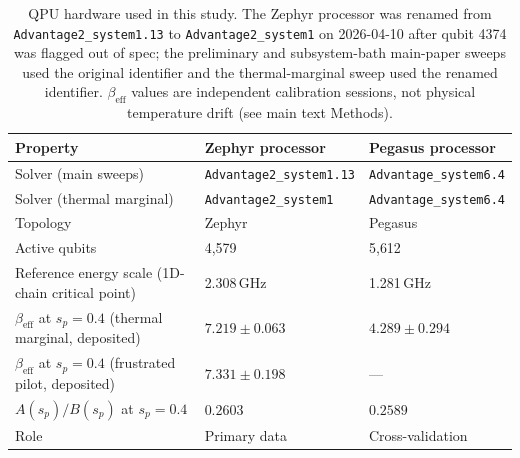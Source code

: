 \documentclass[aps,prapplied,reprint,superscriptaddress,floatfix,nofootinbib]{revtex4-2}
\begin{document}
\begin{table}[!htbp]
\centering
\caption{QPU hardware used in this study.  The Zephyr processor was renamed
from \texttt{Advantage2\_system1.13} to \texttt{Advantage2\_system1} on
2026-04-10 after qubit 4374 was flagged out of spec; the preliminary and subsystem-bath
main-paper sweeps used the original identifier and the thermal-marginal sweep
used the renamed identifier.  $\beta_\mathrm{eff}$ values are independent
calibration sessions, not physical temperature drift (see main text Methods).}
\label{tab:qpus}
\small
\begin{tabular}{lll}
\toprule
Property & Zephyr processor & Pegasus processor \\
\midrule
Solver (main sweeps)     & \texttt{Advantage2\_system1.13} & \texttt{Advantage\_system6.4} \\
Solver (thermal marginal)& \texttt{Advantage2\_system1}    & \texttt{Advantage\_system6.4} \\
Topology                 & Zephyr                          & Pegasus \\
Active qubits            & 4{,}579                         & 5{,}612 \\
Reference energy scale (1D-chain critical point) & 2.308\,GHz                      & 1.281\,GHz \\
$\beta_\mathrm{eff}$ at $s_p{=}0.4$ (thermal marginal, deposited) & $7.219\pm 0.063$ & $4.289\pm 0.294$ \\
$\beta_\mathrm{eff}$ at $s_p{=}0.4$ (frustrated pilot, deposited) & $7.331\pm 0.198$ & --- \\
$A(s_p)/B(s_p)$ at $s_p{=}0.4$ & $0.2603$                & $0.2589$ \\
Role                     & Primary data                    & Cross-validation \\
\bottomrule
\end{tabular}
\end{table}
\end{document}
